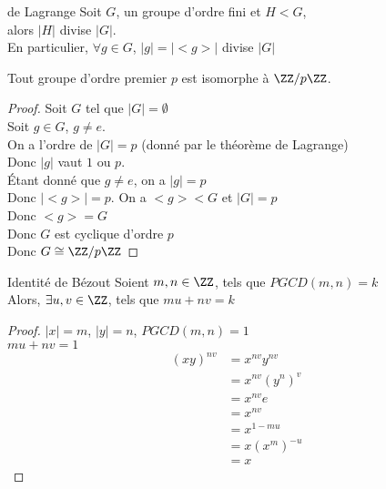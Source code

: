\documentclass[../main.tex]{subfile}
\begin{document}
\begin{theo}{de Lagrange}
	Soit $G$, un groupe d'ordre fini et $H < G$, \\
	alors $|H|$ divise $|G|$.\\
	En particulier, $\forall g \in G$, $|g| = |<g>|$ divise $|G|$
\end{theo}

\begin{corrol}
	Tout groupe d'ordre premier $p$ est isomorphe à $\ZZ/p\ZZ$.
\end{corrol}

\begin{proof}
	Soit $G$ tel que $|G| = \emptyset$\\
	Soit $g \in G$, $g \neq e$.\\
	On a l'ordre de $|G| = p$ (donné par le théorème de Lagrange)\\
	Donc $|g|$ vaut $1$ ou $p$.\\
	\'Etant donné que $g \neq e$, on a $|g| = p$\\
	Donc $|<g>| = p$. On a $<g> < G$ et $|G| = p$\\
	Donc $<g> = G$\\
	Donc $G$ est cyclique d'ordre $p$\\
	Donc $G \cong \ZZ/p\ZZ$
\end{proof}

\begin{theo}{Identité de Bézout}
	Soient $m, n \in \ZZ$, tels que $PGCD(m,n) = k$\\
	Alors, $\exists u, v \in \ZZ$, tels que $mu + nv = k$
\end{theo}

\begin{proof}
	$|x| = m$, $|y| = n$, $PGCD(m,n) = 1$\\
	$mu + nv = 1$\\
	$$
\begin{aligned}
	(xy)^{nv} &= x^{nv}y^{nv}\\
	&= x^{nv}(y^n)^v\\
	&= x^{nv}e\\
	&= x^{nv}\\
	&= x^{1 - mu}\\
	&= x(x^m)^{-u}\\
	&= x
\end{aligned}
	$$
\end{proof}
\end{document}
